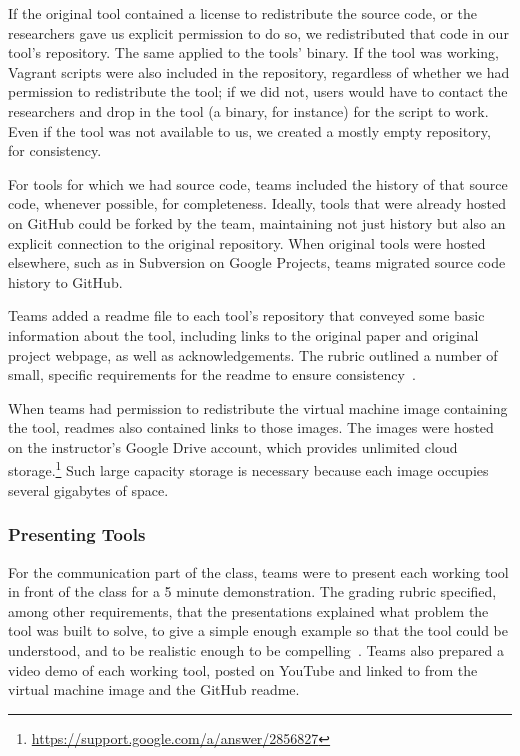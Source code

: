 \documentclass[10pt,conference]{IEEEtran}
\begin{document}
If the original tool contained a license to redistribute
the source code, or the researchers gave us explicit
permission to do so, we redistributed that code 
in our tool's repository.
The same applied to the tools' binary.
If the tool was working, 
Vagrant scripts were also included in the repository,
regardless of whether we had permission to redistribute
the tool; if we did not, users would have to contact the 
researchers and drop in the tool (a binary, for instance)
for the script to work.
Even if the tool was not available to us, we created
a mostly empty repository, for consistency.


For tools for which we had source code,
teams included the history
of that source code, whenever possible, for completeness.
Ideally, tools that were already hosted
on GitHub could be forked by the team,
maintaining not just history but also an 
explicit connection to the original repository.
When original tools were hosted elsewhere, such
as in Subversion on Google Projects, 
teams migrated source code history to GitHub.

Teams added a readme file to each tool's repository
that conveyed some basic information about
the tool, including 
links to the original paper and
original project webpage, 
as well as acknowledgements.
The rubric outlined a number of small,
specific requirements for the readme to
ensure consistency~\cite{github}.

When teams had permission to redistribute
the virtual machine image containing the tool,
readmes also contained links to those images.
The images were hosted on the instructor's 
Google Drive account, which provides unlimited
cloud storage.\footnote{\url{https://support.google.com/a/answer/2856827}}
Such large capacity storage is necessary because each
image occupies several gigabytes of space.

\subsubsection{Presenting Tools}

For the communication part of the class,
teams were to present each working tool in front of the class
for a 5 minute demonstration.
The grading rubric specified, among other requirements,
that the presentations explained what problem the 
tool was built to solve, to give a simple enough
example so that the tool could be understood,
and to be realistic enough to be 
compelling~\cite{presentation}.
Teams also prepared a video demo of each working tool,
posted on YouTube and linked to from the virtual machine
image and the GitHub readme.
\end{document}
